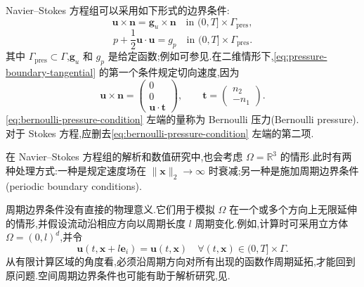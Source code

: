 \begin{note}[压力边界条件]\label{note:pressure-boundary-condition}
Navier--Stokes 方程组可以采用如下形式的边界条件:
\begin{equation}\label{eq:pressure-boundary-tangential}
  \bm{u}\times\bm{n}=\bm{g}_u\times\bm{n}
  \quad\text{in }(0,T]\times\Gamma_{\mathrm{pres}},
\end{equation}
\begin{equation}\label{eq:bernoulli-pressure-condition}
  p+\frac{1}{2}\bm{u}\cdot\bm{u}=g_p
  \quad\text{in }(0,T]\times\Gamma_{\mathrm{pres}}.
\end{equation}
其中 $\Gamma_{\mathrm{pres}}\subset\Gamma$,$\bm{g}_u$ 和 $g_p$ 是给定函数;例如可参见\textcite{Bernardi2015}.在二维情形下,\cref{eq:pressure-boundary-tangential} 的第一个条件规定切向速度,因为
\begin{equation*}
  \bm{u}\times\bm{n}
  =\begin{pmatrix}0\\0\\\bm{u}\cdot\bm{t}\end{pmatrix},
  \qquad
  \bm{t}=\begin{pmatrix}n_2\\-n_1\end{pmatrix}.
\end{equation*}
\cref{eq:bernoulli-pressure-condition} 左端的量称为 Bernoulli 压力(Bernoulli pressure).对于 Stokes 方程,应删去\cref{eq:bernoulli-pressure-condition} 左端的第二项.
\end{note}

\begin{note}[无界区域与周期边界条件]\label{note:infinite-periodic-boundary}
在 Navier--Stokes 方程组的解析和数值研究中,也会考虑 $\Omega=\mathbb{R}^3$ 的情形.此时有两种处理方式:一种是规定速度场在 $\lVert\bm{x}\rVert_2\to\infty$ 时衰减;另一种是施加周期边界条件(periodic boundary conditions).

周期边界条件没有直接的物理意义.它们用于模拟 $\Omega$ 在一个或多个方向上无限延伸的情形,并假设流动沿相应方向以周期长度 $l$ 周期变化.例如,计算时可采用立方体 $\Omega=(0,l)^d$,并令
\begin{equation*}
  \bm{u}(t,\bm{x}+l\bm{e}_i)=\bm{u}(t,\bm{x})
  \quad\forall(t,\bm{x})\in(0,T]\times\Gamma.
\end{equation*}
从有限计算区域的角度看,必须沿周期方向对所有出现的函数作周期延拓,才能回到原问题.空间周期边界条件也可能有助于解析研究,见\textcite[p.~4]{Temam1995}.
\end{note}
